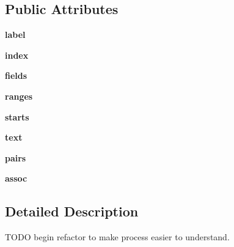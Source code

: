 \subsection*{Public Attributes}
\begin{DoxyCompactItemize}
\item 
\hypertarget{classc_1_1gen___classify_1_1_classify_aed7922274507479379d9901cae776f88}{}{\bfseries label}\label{classc_1_1gen___classify_1_1_classify_aed7922274507479379d9901cae776f88}

\item 
\hypertarget{classc_1_1gen___classify_1_1_classify_a13ee13ddd1fc5a8539ae995ab0871bcd}{}{\bfseries index}\label{classc_1_1gen___classify_1_1_classify_a13ee13ddd1fc5a8539ae995ab0871bcd}

\item 
\hypertarget{classc_1_1gen___classify_1_1_classify_a8383525905cdc72036ce1262e9c733f3}{}{\bfseries fields}\label{classc_1_1gen___classify_1_1_classify_a8383525905cdc72036ce1262e9c733f3}

\item 
\hypertarget{classc_1_1gen___classify_1_1_classify_aedf686035124b10af7bb93e6d7f0dcfc}{}{\bfseries ranges}\label{classc_1_1gen___classify_1_1_classify_aedf686035124b10af7bb93e6d7f0dcfc}

\item 
\hypertarget{classc_1_1gen___classify_1_1_classify_a5228125991d75d1e5f2618819384bd87}{}{\bfseries starts}\label{classc_1_1gen___classify_1_1_classify_a5228125991d75d1e5f2618819384bd87}

\item 
\hypertarget{classc_1_1gen___classify_1_1_classify_af0e04a5c3adf89a3b08e85f295b858f6}{}{\bfseries text}\label{classc_1_1gen___classify_1_1_classify_af0e04a5c3adf89a3b08e85f295b858f6}

\item 
\hypertarget{classc_1_1gen___classify_1_1_classify_adb928289669c8d0ae9843d4f81e4f2db}{}{\bfseries pairs}\label{classc_1_1gen___classify_1_1_classify_adb928289669c8d0ae9843d4f81e4f2db}

\item 
\hypertarget{classc_1_1gen___classify_1_1_classify_abc04abbe32b570dffb074ad56b4110e5}{}{\bfseries assoc}\label{classc_1_1gen___classify_1_1_classify_abc04abbe32b570dffb074ad56b4110e5}

\end{DoxyCompactItemize}


\subsection{Detailed Description}
\begin{DoxyVerb}TODO begin refactor to make process easier to understand.
\end{DoxyVerb}
 

